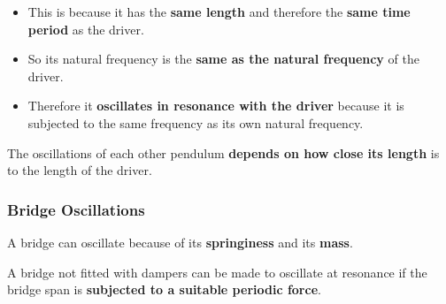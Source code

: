\begin{itemize}
    \item This is because it has the \textbf{same length} and therefore the \textbf{same time period} as the driver.
    \item So its natural frequency is the \textbf{same as the natural frequency} of the driver.
    \item Therefore it \textbf{oscillates in resonance with the driver} because it is subjected to the same frequency as its own natural frequency.
\end{itemize}

The oscillations of each other pendulum \textbf{depends on how close its length} is to the length of the driver.

\subsubsection*{Bridge Oscillations}

A bridge can oscillate because of its \textbf{springiness} and its \textbf{mass}.

A bridge not fitted with dampers can be made to oscillate at resonance if the bridge span is \textbf{subjected to a suitable periodic force}.
